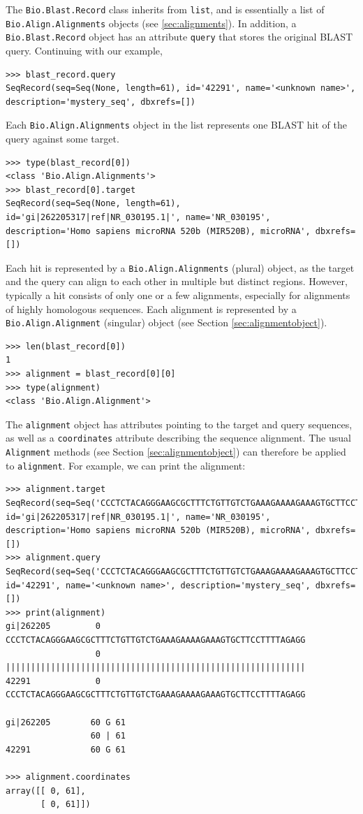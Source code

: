 The \verb|Bio.Blast.Record| class inherits from \verb+list+, and is essentially a list of \verb|Bio.Align.Alignments| objects (see \ref{sec:alignments}). In addition, a \verb|Bio.Blast.Record| object has an attribute \verb|query| that stores the original BLAST query. Continuing with our example,
\begin{verbatim}
>>> blast_record.query
SeqRecord(seq=Seq(None, length=61), id='42291', name='<unknown name>', description='mystery_seq', dbxrefs=[])
\end{verbatim}
Each \verb|Bio.Align.Alignments| object in the list represents one BLAST hit of the query against some target.
\begin{verbatim}
>>> type(blast_record[0])
<class 'Bio.Align.Alignments'>
>>> blast_record[0].target
SeqRecord(seq=Seq(None, length=61), id='gi|262205317|ref|NR_030195.1|', name='NR_030195', description='Homo sapiens microRNA 520b (MIR520B), microRNA', dbxrefs=[])
\end{verbatim}
Each hit is represented by a \verb|Bio.Align.Alignments| (plural) object, as the target and the query can align to each other in multiple but distinct regions.
However, typically a hit consists of only one or a few alignments, especially for alignments of highly homologous sequences. Each alignment is represented by a  \verb|Bio.Align.Alignment| (singular) object (see Section \ref{sec:alignmentobject}).
\begin{verbatim}
>>> len(blast_record[0])
1
>>> alignment = blast_record[0][0]
>>> type(alignment)
<class 'Bio.Align.Alignment'>
\end{verbatim}
The \verb|alignment| object has attributes pointing to the target and query sequences, as well as a \verb|coordinates| attribute describing the sequence alignment. The usual \verb|Alignment| methods (see Section \ref{sec:alignmentobject}) can therefore be applied to \verb|alignment|. For example, we can print the alignment:
\begin{verbatim}
>>> alignment.target
SeqRecord(seq=Seq('CCCTCTACAGGGAAGCGCTTTCTGTTGTCTGAAAGAAAAGAAAGTGCTTCCTTT...GGG'), id='gi|262205317|ref|NR_030195.1|', name='NR_030195', description='Homo sapiens microRNA 520b (MIR520B), microRNA', dbxrefs=[])
>>> alignment.query
SeqRecord(seq=Seq('CCCTCTACAGGGAAGCGCTTTCTGTTGTCTGAAAGAAAAGAAAGTGCTTCCTTT...GGG'), id='42291', name='<unknown name>', description='mystery_seq', dbxrefs=[])
>>> print(alignment)
gi|262205         0 CCCTCTACAGGGAAGCGCTTTCTGTTGTCTGAAAGAAAAGAAAGTGCTTCCTTTTAGAGG
                  0 ||||||||||||||||||||||||||||||||||||||||||||||||||||||||||||
42291             0 CCCTCTACAGGGAAGCGCTTTCTGTTGTCTGAAAGAAAAGAAAGTGCTTCCTTTTAGAGG

gi|262205        60 G 61
                 60 | 61
42291            60 G 61

>>> alignment.coordinates
array([[ 0, 61],
       [ 0, 61]])
\end{verbatim}

